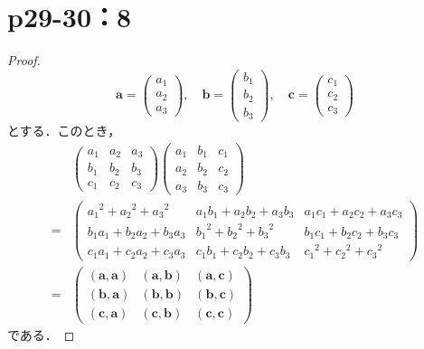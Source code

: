 \documentclass[a4paper,10pt,fleqn]{ltjsarticle}
\begin{document}
\section*{p29-30：8}
\begin{tleftbar}
    \begin{proof}
        \[
            \bm{a}=\begin{pmatrix} a_1 \\ a_2 \\ a_3 \end{pmatrix},\quad \bm{b}=\begin{pmatrix} b_1 \\ b_2 \\ b_3 \end{pmatrix},\quad \bm{c}=\begin{pmatrix} c_1 \\ c_2 \\ c_3 \end{pmatrix}
        \]
        とする．このとき，
        \begin{align*}
              &
            \begin{pmatrix}
                a_1 & a_2 & a_3 \\
                b_1 & b_2 & b_3 \\
                c_1 & c_2 & c_3
            \end{pmatrix}
            \begin{pmatrix}
                a_1 & b_1 & c_1 \\
                a_2 & b_2 & c_2 \\
                a_3 & b_3 & c_3
            \end{pmatrix}
            \\
            = & \begin{pmatrix}
                    {a_1}^2 +{a_2}^2 +{a_3}^2   & a_1 b_1 + a_2 b_2 + a_3 b_3 & a_1 c_1 + a_2 c_2 + a_3 c_3 \\
                    b_1 a_1 + b_2 a_2 + b_3 a_3 & {b_1}^2 +{b_2}^2 + {b_3}^2  & b_1 c_1 + b_2 c_2 + b_3 c_3 \\
                    c_1 a_1 + c_2 a_2 + c_3 a_3 & c_1 b_1 + c_2 b_2 + c_3 b_3 & {c_1}^2 +{c_2}^2 +{c_3}^2
                \end{pmatrix}
            \\
            = & \begin{pmatrix}
                    (\bm{a},\bm{a}) & (\bm{a},\bm{b}) & (\bm{a},\bm{c}) \\
                    (\bm{b},\bm{a}) & (\bm{b},\bm{b}) & (\bm{b},\bm{c}) \\
                    (\bm{c},\bm{a}) & (\bm{c},\bm{b}) & (\bm{c},\bm{c})
                \end{pmatrix}
        \end{align*}
        である．


\end{proof}
\end{tleftbar}
\end{document}
